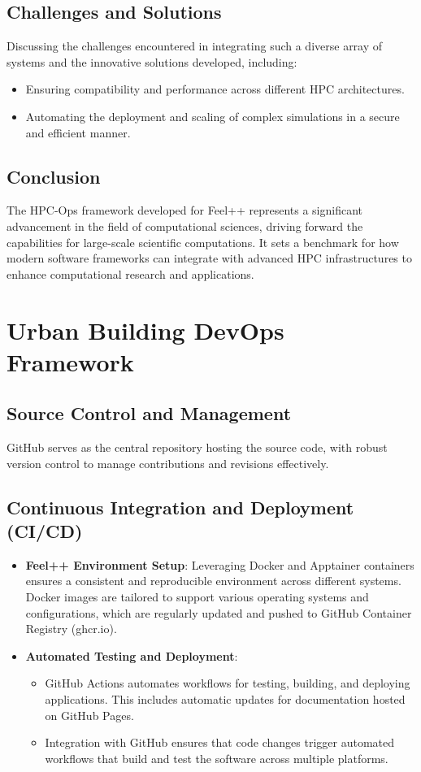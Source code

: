 \documentclass[runningheads]{llncs}
\begin{document}
\subsection{Challenges and Solutions}
Discussing the challenges encountered in integrating such a diverse array of systems and the innovative solutions developed, including:
\begin{itemize}
    \item Ensuring compatibility and performance across different HPC architectures.
    \item Automating the deployment and scaling of complex simulations in a secure and efficient manner.
\end{itemize}

\subsection{Conclusion}
The HPC-Ops framework developed for Feel++ represents a significant advancement in the field of computational sciences, driving forward the capabilities for large-scale scientific computations. It sets a benchmark for how modern software frameworks can integrate with advanced HPC infrastructures to enhance computational research and applications.

\section{Urban Building DevOps Framework}

\subsection{Source Control and Management}
GitHub serves as the central repository hosting the source code, with robust version control to manage contributions and revisions effectively.

\subsection{Continuous Integration and Deployment (CI/CD)}
\begin{itemize}
    \item \textbf{Feel++ Environment Setup}: Leveraging Docker and Apptainer containers ensures a consistent and reproducible environment across different systems. Docker images are tailored to support various operating systems and configurations, which are regularly updated and pushed to GitHub Container Registry (ghcr.io).
    \item \textbf{Automated Testing and Deployment}:
    \begin{itemize}
        \item GitHub Actions automates workflows for testing, building, and deploying applications. This includes automatic updates for documentation hosted on GitHub Pages.
        \item Integration with GitHub ensures that code changes trigger automated workflows that build and test the software across multiple platforms.
    \end{itemize}
\end{itemize}
\end{document}

